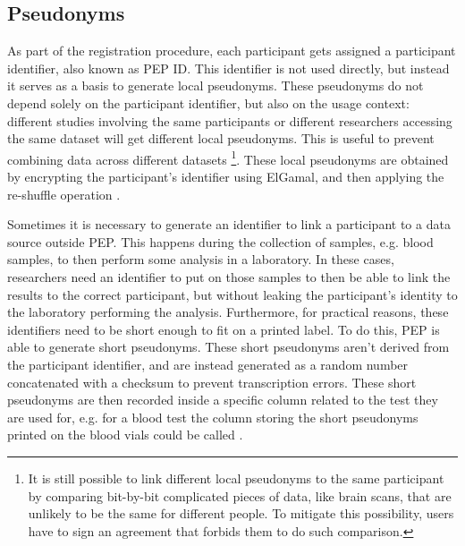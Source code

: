 \documentclass{report}
\begin{document}
\subsection{Pseudonyms}
As part of the registration procedure, each participant gets assigned a participant identifier, also known as PEP ID. This identifier is not used directly, but instead it serves as a basis to generate
local pseudonyms. These pseudonyms do not depend solely on the participant identifier, but also on the usage context: different studies involving the same participants or different
researchers accessing the same dataset will get different local pseudonyms. This is useful to prevent combining data across different datasets \footnote{It is still possible to
link different local pseudonyms to the same participant by comparing bit-by-bit complicated pieces of data, like brain scans, that are unlikely to be the same for different people. To 
mitigate this possibility, users have to sign an agreement that forbids them to do such comparison.}. These local pseudonyms are obtained by encrypting the participant's identifier 
using ElGamal, and then applying the re-shuffle operation \cite{pep-blueprint}. \par
Sometimes it is necessary to generate an identifier to link a participant to a data source outside PEP. This happens during the collection of samples, e.g. blood samples, to then
perform some analysis in a laboratory. In these cases, researchers need an identifier to put on those samples to then be able to link the results to the correct participant, but
without leaking the participant's identity to the laboratory performing the analysis. Furthermore, for practical reasons, these identifiers need to be short enough to fit on a printed label. To do this, PEP is able to generate short
pseudonyms. These short pseudonyms aren't derived from the participant identifier, and are instead generated as a random number concatenated with a checksum to prevent
transcription errors. These short pseudonyms are then recorded inside a specific column related to the test they are used for, e.g. for a blood test the column storing the short
pseudonyms printed on the blood vials could be called   \cite{pep-blueprint}.
\end{document}
